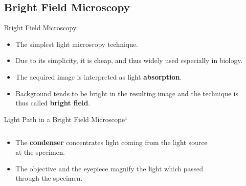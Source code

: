 \subsection{Bright Field Microscopy}
\begin{frame}[c]{Bright Field Microscopy}
	\begin{itemize}
		\setlength\itemsep{0.4cm}
		\item<1-> The simplest light microscopy technique.
		\item<2-> Due to its simplicity, it is cheap, and thus widely used especially in biology.
		\item<3-> The acquired image is interpreted as light \textbf{absorption}.
		\item<4-> Background tends to be bright in the resulting image and the technique is thus called \textbf{bright field}.
	\end{itemize}
\end{frame}
\begin{frame}[c]{Light Path in a Bright Field Microscope$^1$}
    \vspace{-1.5cm}
	\begin{columns}[c,onlytextwidth]
		\begin{column}{0.4\textwidth}
			\begin{itemize}
				\item<1-> The \textbf{condenser} concentrates light coming from the light source at the specimen.
				\item<2-> The objective and the eyepiece magnify the light which passed through the specimen.
			\end{itemize}
		\end{column}\begin{column}{0.6\textwidth}
			\vspace{10mm}
			\begin{figure}
				\def\svgwidth{4cm}
			 	
			\end{figure}
		\end{column}
	\end{columns}
\end{frame}
